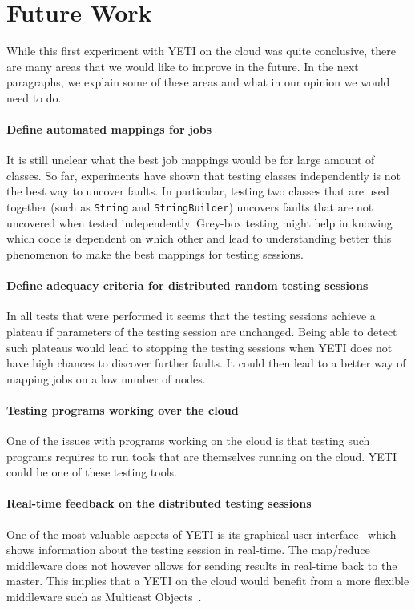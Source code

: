 \section{Future Work}\label{sec:future}

While this first experiment with YETI on the cloud was quite 
conclusive, there are many areas that we would like to improve 
in the future. In the next paragraphs, we explain some of these 
areas and what in our opinion we would need to do.

\paragraph{Define automated mappings for jobs}
It is still unclear what the best job mappings would be for large 
amount of classes. So far, experiments have shown that testing classes
independently is not the best way to uncover faults. In particular, 
testing two classes that are used together (such as \texttt{String} and 
\texttt{StringBuilder}) uncovers faults that are not uncovered when tested 
independently. Grey-box testing might help in knowing which code is dependent 
on which other and lead to understanding better this phenomenon to make
the best mappings for testing sessions.

\paragraph{Define adequacy criteria for distributed random testing sessions}
In all tests that were performed it seems that the testing sessions
achieve a plateau if parameters of the testing session are unchanged. 
Being able to detect such plateaus would lead to stopping the testing sessions
when YETI does not have high chances to discover further faults. It could then
lead to a better way of mapping jobs on a low number of nodes.


\paragraph{Testing programs working over the cloud}
One of the issues with programs working on the cloud is that testing such 
programs requires to run tools that are themselves running on the cloud.
YETI could be one of these testing tools.


\paragraph{Real-time feedback on the distributed testing sessions}
One of the most valuable aspects of YETI is its graphical user interface~\cite{} 
which shows information about the testing session in real-time. The 
map/reduce middleware does not however allows for sending results in real-time
back to the master. This implies that a YETI on the cloud would benefit from a more 
flexible middleware such as Multicast Objects~\cite{}.
